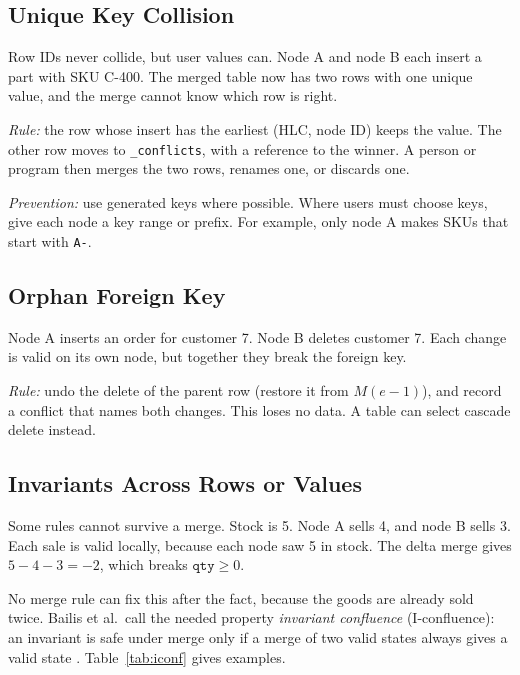 \documentclass[journal]{IEEEtran}
\newcommand{\code}[1]{\texttt{#1}}
\begin{document}
\subsection{Unique Key Collision}\label{sec:unique}
Row IDs never collide, but user values can. Node A and node B each insert a part with SKU C-400. The merged table now has two rows with one unique value, and the merge cannot know which row is right.

\emph{Rule:} the row whose insert has the earliest (HLC, node ID) keeps the value. The other row moves to \code{\_conflicts}, with a reference to the winner. A person or program then merges the two rows, renames one, or discards one.

\emph{Prevention:} use generated keys where possible. Where users must choose keys, give each node a key range or prefix. For example, only node A makes SKUs that start with \code{A-}.

\subsection{Orphan Foreign Key}\label{sec:fk}
Node A inserts an order for customer 7. Node B deletes customer 7. Each change is valid on its own node, but together they break the foreign key.

\emph{Rule:} undo the delete of the parent row (restore it from $M(e{-}1)$), and record a conflict that names both changes. This loses no data. A table can select cascade delete instead.

\subsection{Invariants Across Rows or Values}\label{sec:invariants}
Some rules cannot survive a merge. Stock is 5. Node A sells 4, and node B sells 3. Each sale is valid locally, because each node saw 5 in stock. The delta merge gives $5-4-3=-2$, which breaks $\texttt{qty}\ge 0$.

No merge rule can fix this after the fact, because the goods are already sold twice. Bailis et al.\ call the needed property \emph{invariant confluence} (I-confluence): an invariant is safe under merge only if a merge of two valid states always gives a valid state \cite{bailis2014}. Table~\ref{tab:iconf} gives examples.
\end{document}
